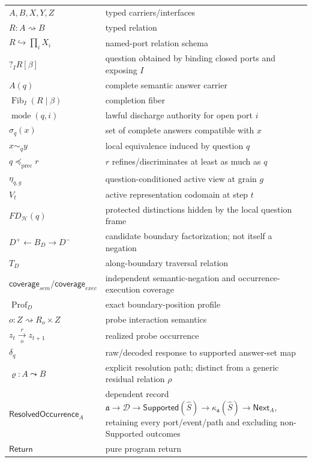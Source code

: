 \documentclass[11pt,oneside]{article}
\newcommand{\Fib}{\operatorname{Fib}}
\newcommand{\Prof}{\operatorname{Prof}}
\newcommand{\AskRef}{\mathfrak a}
\newcommand{\ResPath}{\varrho}
\begin{document}
\begin{longtable}{>{\raggedright\arraybackslash}p{}
                  >{\raggedright\arraybackslash}p{}}
\(A,B,X,Y,Z\) & typed carriers/interfaces\\
\(R:A\rightsquigarrow B\) & typed relation\\
\(R\hookrightarrow\prod_i X_i\) & named-port relation schema\\
\(?_I R[\beta]\) & question obtained by binding closed ports and exposing \(I\)\\
\(A(q)\) & complete semantic answer carrier\\
\(\Fib_I(R\mid\beta)\) & completion fiber\\
\(\operatorname{mode}(q,i)\) & lawful discharge authority for open port \(i\)\\
\(\sigma_q(x)\) & set of complete answers compatible with \(x\)\\
\(x\sim_q y\) & local equivalence induced by question \(q\)\\
\(q\preceq_{\mathrm{prec}}r\) & \(r\) refines/discriminates at least as much as \(q\)\\
\(\eta_{q,g}\) & question-conditioned active view at grain \(g\)\\
\(V_t\) & active representation codomain at step \(t\)\\
\(FD_{\mathcal H}(q)\) & protected distinctions hidden by the local question frame\\
\(D^+\leftarrow B_D\rightarrow D^-\) & candidate boundary factorization; not itself a negation\\
\(T_D\) & along-boundary traversal relation\\
\(\mathsf{coverage}_{sem}/\mathsf{coverage}_{exec}\) & independent semantic-negation and occurrence-execution coverage\\
\(\Prof_D\) & exact boundary-position profile\\
\(o:Z\rightsquigarrow R_o\times Z\) & probe interaction semantics\\
\(z_t\xrightarrow[o]{r}z_{t+1}\) & realized probe occurrence\\
\(\delta_q\) & raw/decoded response to supported answer-set map\\
\(\ResPath:A\leadsto B\) & explicit resolution path; distinct from a generic residual relation \(\rho\)\\
\(\mathsf{ResolvedOccurrence}_A\) & dependent record \(\AskRef\to\mathcal D\to\mathsf{Supported}(\widehat S)\to\kappa_{\AskRef}(\widehat S)\to\mathsf{Next}_A\), retaining every port/event/path and excluding non-Supported outcomes\\
\(\mathsf{Return}\) & pure program return\\

\end{longtable}
\end{document}
